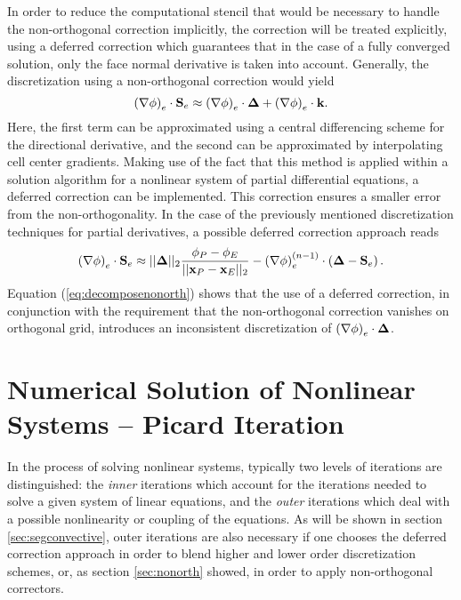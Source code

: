 In order to reduce the computational stencil that would be necessary to handle the non-orthogonal correction implicitly, the correction will be treated explicitly, using a deferred correction which guarantees that in the case of a fully converged solution, only the face normal derivative is taken into account. Generally, the discretization using a non-orthogonal correction would yield 
\begin{displaymath}
  \left( \nabla \phi \right)_e \cdot \mathbf{S}_e \approx \left(\nabla \phi \right)_e \cdot \boldsymbol{\Delta} + \left( \nabla \phi \right)_e \cdot \mathbf{k}.
\end{displaymath}
Here, the first term can be approximated using a central differencing scheme for the directional derivative, and the second can be approximated by interpolating cell center gradients. Making use of the fact that this method is applied within a solution algorithm for a nonlinear system of partial differential equations, a deferred correction can be implemented. This correction ensures a smaller error from the non-orthogonality. In the case of the previously mentioned discretization techniques for partial derivatives, a possible deferred correction approach reads
\begin{equation}
  \label{eq:decomposenonorth}
  \left( \nabla \phi \right)_e \cdot \mathbf{S}_e \approx ||\boldsymbol{\Delta}||_2 \frac{\phi_P - \phi_E}{||\mathbf{x}_P - \mathbf{x}_E||_2} - \left(\nabla \phi \right)_e^{(n-1)} \cdot \left(\boldsymbol{\Delta} - \mathbf{S}_e \right).
\end{equation}
Equation (\ref{eq:decomposenonorth}) shows that the use of a deferred correction, in conjunction with the requirement that the non-orthogonal correction vanishes on orthogonal grid, introduces an inconsistent discretization of \( \left(\nabla \phi \right)_e \cdot \boldsymbol{\Delta} \).

\section{Numerical Solution of Nonlinear Systems -- Picard Iteration}
\label{sec:nonlinear}

In the process of solving nonlinear systems, typically two levels of iterations are distinguished: the \emph{inner} iterations which account for the iterations needed to solve a given system of linear equations, and the \emph{outer} iterations which deal with a possible nonlinearity or coupling of the equations. As will be shown in section \ref{sec:segconvective}, outer iterations are also necessary if one chooses the deferred correction approach in order to blend higher and lower order discretization schemes, or, as section \ref{sec:nonorth} showed, in order to apply non-orthogonal correctors.


